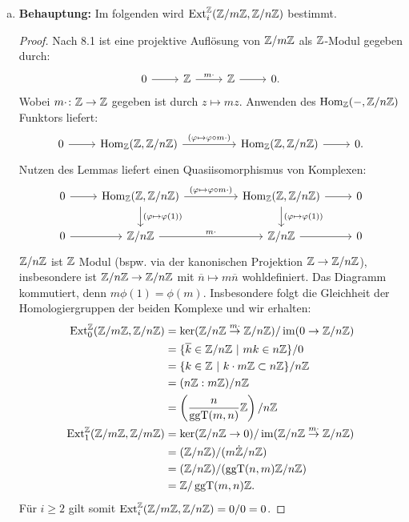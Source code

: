 \documentclass{nico_zettelsose21}
\newcommand{\ggt}{\operatorname{ggT}}
\newcommand{\Zn}{\Z/n\Z}
\newcommand{\Zm}{\Z/m\Z}
\newcommand{\Ext}{\operatorname{Ext}}
\renewcommand{\im}{\operatorname{im}}
\begin{document}
\begin{enumerate}[(a)]
    \item   \textbf{Behauptung:} Im folgenden wird $\Ext_{i}^{\Z}(\Zm,\Zn)$ bestimmt. 
            \begin{proof}
                Nach 8.1 ist eine projektive Auflösung von $\Zm$ als $\mathbb{Z}$-Modul gegeben durch:
                \[
                \begin{tikzcd}
                    0 \arrow[r] &\Z \arrow[r, "m\cdot"] &\Z \arrow[r] &0.
                \end{tikzcd}
                \]
                Wobei $m\cdot \colon \mathbb{Z} \to \mathbb{Z}$ gegeben ist durch $z \mapsto mz$. 
                Anwenden des $\Hom_{\Z}(-,\Zn)$ Funktors liefert:
                \[
                \begin{tikzcd}
                    0 \arrow[r] &\Hom_{\Z}(\Z,\Zn) \arrow[rr, "(\varphi \mapsto \varphi \circ m\cdot)"] &&\Hom_{\Z}(\Z,\Zn) \arrow[r] &0.
                \end{tikzcd}
                \]
                Nutzen des Lemmas liefert einen Quasiisomorphismus von Komplexen:
                \[
                \begin{tikzcd}
                    0 \arrow[r] &\Hom_{\Z}(\Z,\Zn) \arrow[rr, "(\varphi \mapsto \varphi \circ m\cdot)"] \arrow[d, "(\varphi \mapsto \varphi(1))"] &&\Hom_{\Z}(\Z,\Zn) \arrow[r] \arrow[d, "(\varphi \mapsto \varphi(1))"] &0 \\
                    0 \arrow[r] &\Zn \arrow[rr, "m\cdot"] &&\Zn \arrow[r] &0
                \end{tikzcd}
                \]
                $\Zn$ ist $\mathbb{Z}$ Modul (bspw. via der kanonischen Projektion $\Z \to \Zn$), insbesondere ist $\Zn \to \Zn$ mit 
                $\overline{n} \mapsto m \overline{n}$ wohldefiniert. Das Diagramm kommutiert, denn $m\phi(1) = \phi(m)$.
                Insbesondere folgt die Gleichheit der Homologiergruppen der beiden Komplexe und wir erhalten:
                \begin{align*}
                    \Ext_{0}^{\Z}(\Zm,\Zn) &= \ker(\Zn \stackrel{m \cdot}{\rightarrow} \Zn)/\im(0 \to \Zn) \\
                    &= \{\overline{k} \in \Zn \ | \ mk \in n\Z\}/0 \\
                    &= \{k \in \Z \ | \ k \cdot m\Z \subset n\Z\}/n\Z \\
                    &= (n\Z : m\Z)/n\Z \\
                    &= \left( \frac{n}{\ggt(m,n)}\Z \right)/n\Z \\
                    \Ext_{1}^{\Z}(\Zm,\Zm) &= \ker(\Zn \to 0)/\im(\Zn \stackrel{m \cdot}{\rightarrow} \Zn) \\
                    &= (\Zn)/(m \dot \Zn) \\
                    &= (\Zn)/(\ggt(n,m)\Z/n\Z) \\
                    &= \Z/\ggt(m,n)\Z.
                \end{align*}
                Für $i\geq 2$ gilt somit $\Ext_{i}^{\Z}(\Zm,\Zn) = 0/0 = 0$. 
            \end{proof}
    

\end{enumerate}
\end{document}
